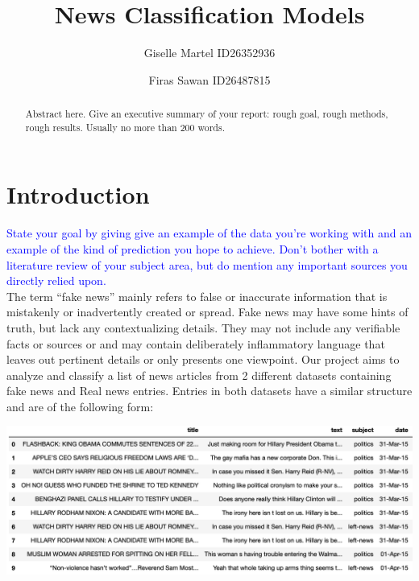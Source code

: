 \documentclass[10pt,twocolumn,letterpaper]{article}
\begin{document}
\title{News Classification Models}
\author{Giselle Martel ID26352936 \and Firas Sawan ID26487815}
\maketitle

\begin{abstract}
   Abstract here. Give an executive summary of your report: rough goal, rough methods, rough results. Usually no more than 200 words.
\end{abstract}

\section{Introduction}
\textcolor{blue}{State your goal by giving give an example of the data you're working with and an example of the kind of prediction you hope to achieve. Don't bother with a literature review of your subject area, but do mention any important sources you directly relied upon.}\\

The term “fake news” mainly refers to false or inaccurate information that is mistakenly or inadvertently created or spread. Fake news may have some hints of truth, but lack any contextualizing details. They may not include any verifiable facts or sources or and may contain deliberately inflammatory language that leaves out pertinent details or only presents one viewpoint. Our project aims to analyze and classify a list of news articles from 2 different datasets containing fake news and Real news entries. Entries in both datasets have a similar structure and are of the following form:   

\begin{center}
\includegraphics[width=\linewidth]{Latex_Report/report/dt_example.png}
\end{center}
\end{document}
